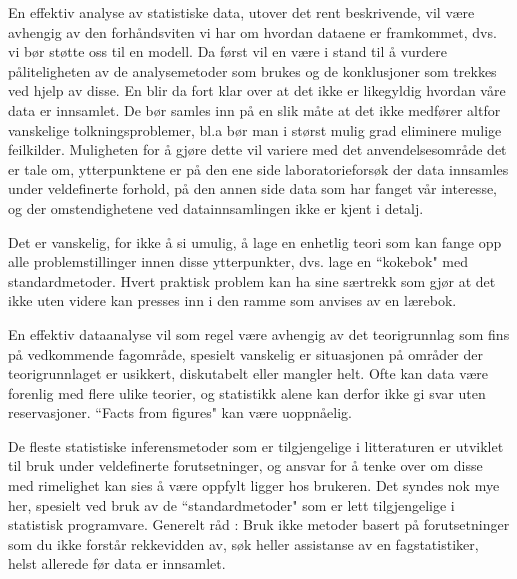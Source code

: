 En effektiv analyse av statistiske data, utover det rent beskrivende,
vil være avhengig av den forhåndsviten vi har om hvordan
dataene er framkommet, dvs. vi bør støtte oss til en modell.  Da
først vil en være i stand til å vurdere påliteligheten
av de analysemetoder som brukes og de konklusjoner som trekkes ved 
hjelp av disse.  En blir da fort klar over at det ikke er like\-gyldig
hvordan våre data er innsamlet.  De bør samles inn på en
slik måte at det ikke medfører altfor vanskelige tolkningsproblemer,
bl.a bør man i størst mulig grad eliminere mulige feilkilder.
Muligheten for å gjøre dette vil variere med det anvendelsesområde 
det er tale om, ytterpunktene er på den ene side laboratorieforsøk
der data innsamles under veldefinerte forhold, på den annen
side data som har fanget vår interesse, og der omstendighetene ved
datainnsamlingen ikke er kjent i detalj.

Det er vanskelig, for ikke å si umulig, å lage en enhetlig teori som
kan fange opp alle problemstillinger innen disse ytterpunkter, dvs.
lage en ``kokebok" med standardmetoder. Hvert praktisk problem kan ha
sine særtrekk som gjør at det ikke uten videre kan presses inn i den
ramme som anvises av en lærebok.

En effektiv dataanalyse vil som regel være avhengig av det teorigrunnlag
som fins på vedkommende fagområde, spesielt vanskelig er situasjonen 
på områder der teorigrunnlaget er usikkert, diskutabelt eller mangler
helt. Ofte kan data være forenlig med flere ulike teorier, og statistikk
alene kan derfor ikke gi svar uten reservasjoner. ``Facts from figures" kan
være uoppnåelig.

De fleste statistiske inferensmetoder som er tilgjengelige i litteraturen 
er utviklet til bruk under veldefinerte forutsetninger, og ansvar for å
tenke over om disse med rimelighet kan sies å være oppfylt ligger
hos brukeren. Det syndes nok mye her, spesielt ved bruk av de 
``standardmetoder" som er lett tilgjengelige i statistisk programvare. 
Generelt råd : Bruk ikke metoder basert på forutsetninger som
du ikke forstår rekkevidden av, søk heller
assistanse av en fagstatistiker, helst allerede før data er innsamlet.
